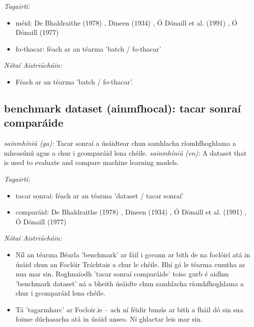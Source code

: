 \documentclass{article}
\begin{document}
 \noindent \textit{Tagairtí:}
\begin{itemize}
	\item méid: De Bhaldraithe (1978) \cite{de-bhaldraithe}, Dineen (1934) \cite{dineen}, Ó Dónaill et al. (1991) \cite{focloir-beag}, Ó Dónaill (1977) \cite{odonaill}
	\item fo-thacar: féach ar an téarma 'batch / fo-thacar'
\end{itemize}

 \noindent \textit{Nótaí Aistriúcháin:}
\begin{itemize}
	\item Féach ar an téarma 'batch / fo-thacar'.
\end{itemize}


\subsection*{benchmark dataset (ainmfhocal): tacar sonraí comparáide} 
 \noindent \textit{sainmhíniú (ga):} Tacar sonraí a úsáidtear chun samhlacha ríomhfhoghlama a mheasúnú agus a chur i gcomparáid lena chéile.
\newline\newline
 \noindent \textit{sainmhíniú (en):} A dataset that is used to evaluate and compare machine learning models.
\newline

 \noindent \textit{Tagairtí:}
\begin{itemize}
	\item tacar sonraí: féach ar an téarma 'dataset / tacar sonraí'
	\item comparáid: De Bhaldraithe (1978) \cite{de-bhaldraithe}, Dineen (1934) \cite{dineen}, Ó Dónaill et al. (1991) \cite{focloir-beag}, Ó Dónaill (1977) \cite{odonaill}
\end{itemize}

 \noindent \textit{Nótaí Aistriúcháin:}
\begin{itemize}
	\item Níl an téarma Béarla 'benchmark' ar fáil i gceann ar bith de na foclóirí atá in úsáid chun an Foclóir Tráchtais a chur le chéile. Bhí gá le téarma cumtha as nua mar sin. Roghnaíodh 'tacar sonraí comparáide' toisc gurb é aidhm 'benchmark dataset' ná a bheith úsáidte chun samhlacha ríomhfhoghlama a chur i gcomparáid lena chéile.
	\item Tá 'tagarmharc' ar Focloir.ie -- ach ní féidir bunús ar bith a fháil dó sin sna foinse dúchasacha atá in úsáid anseo. Ní ghlactar leis mar sin.
\end{itemize}
\end{document}

